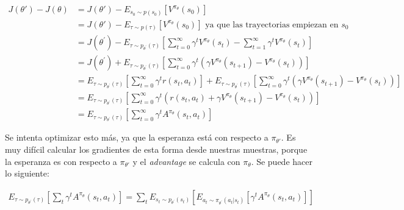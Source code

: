 \begin{align}
    J(\theta') - J(\theta) &=
    J(\theta')-E_{s_0\sim p(s_0)}[V^{\pi_\theta}(s_0)]\\
    &=J(\theta')-E_{\tau\sim p(\tau)}[V^{\pi_\theta}(s_0)] \textrm{ ya que las trayectorias
    empiezan en } s_0\\
    &= J ( \theta ^ { \prime } ) - E _ { \tau \sim p _ { \theta ^ { \prime } } ( \tau ) } \left[
        \sum _ { t = 0 } ^ { \infty } \gamma ^ { t } V ^ { \pi _ { \theta } } ( s _ { t } ) -
        \sum _ { t = 1 } ^ { \infty } \gamma ^ { t } V ^ { \pi _ { \theta } } ( s _ { t } )
    \right]\\
    &= J ( \theta ^ { \prime } ) + E _ { \tau \sim p _ { \theta ^ { \prime } } ( \tau ) } \left[
        \sum _ { t = 0 } ^ { \infty } \gamma ^ { t } ( \gamma V ^ { \pi _ { \theta } } ( s _ { t
        + 1 } ) - V ^ { \pi _ { \theta } } ( s _ { t } ) ) \right]\\
    &= E _ { \tau \sim p _ { \theta ^ { \prime } } ( \tau ) } \left[ \sum _ { t = 0 } ^ { \infty
        } \gamma ^ { t } r ( s _ { t } , a _ { t } ) \right] + E _ { \tau \sim p _ { \theta ^ { \prime
    } } ( \tau ) } \left[ \sum _ { t = 0 } ^ { \infty } \gamma ^ { t } ( \gamma V ^ { \pi _ {
    \theta } } ( s _ { t + 1 } ) - V ^ { \pi _ { \theta } } ( s _ { t } ) ) \right]\\
&=E _ { \tau \sim p _ { \theta ^ { \prime } } ( \tau ) } \left[ \sum _ { t = 0 } ^ { \infty }
    \gamma ^ { t } ( r ( s _ { t } , a _ { t } ) + \gamma V ^ { \pi _ { \theta } } ( s _ { t + 1
    } ) - V ^ { \pi _ { \theta } } ( s _ { t } ) ) \right]\\
&= E _ { \tau \sim p _ { \theta ^ { \prime } } ( \tau ) } \left[ \sum _ { t = 0 } ^ { \infty }
\gamma ^ { t } A ^ { \pi _ { \theta } } ( s _ { t } , a _ { t } )\right]
\end{align}

Se intenta optimizar esto más, ya que la esperanza está con respecto a $\pi_{\theta'}$. Es
muy difícil calcular los gradientes de esta forma desde nuestras muestras, porque la esperanza
es con respecto a $\pi_{\theta'}$ y el \textit{advantage} se calcula con $\pi_\theta$. Se
puede hacer lo siguiente:

\begin{align}
E _ { \tau \sim p _ { \theta ^ { \prime } } ( \tau ) } \left[ \sum _ { t } \gamma ^ { t } A ^ {
    \pi _ { \theta } } ( s _ { t } , a _ { t } ) \right] = \sum _ { t } E _ { s _ { t } \sim p _ { \theta ^ { \prime } } ( s _ { t } ) } [ E _ { a _ { t } \sim \pi _ { \theta ^ { \prime } } ( a _ { t } | s _ { t } ) } [ \gamma ^ { t } A ^ { \pi _ { \theta } } ( s _ { t } , a _ { t } ) ] ]
\end{align}

